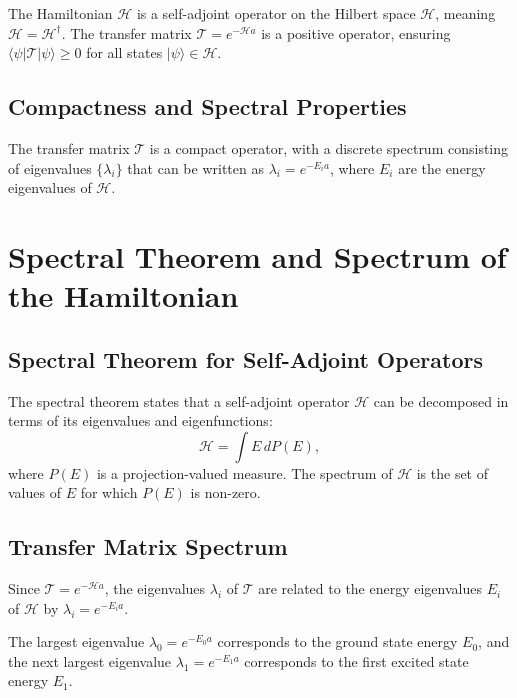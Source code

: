 The Hamiltonian \(\mathcal{H}\) is a self-adjoint operator on the Hilbert space \(\mathcal{H}\), meaning \(\mathcal{H} = \mathcal{H}^\dagger\). The transfer matrix \(\mathcal{T} = e^{-\mathcal{H}a}\) is a positive operator, ensuring \(\langle \psi | \mathcal{T} | \psi \rangle \geq 0\) for all states \(|\psi\rangle \in \mathcal{H}\).

\subsection{Compactness and Spectral Properties}

The transfer matrix \(\mathcal{T}\) is a compact operator, with a discrete spectrum consisting of eigenvalues \(\{\lambda_i\}\) that can be written as \(\lambda_i = e^{-E_i a}\), where \(E_i\) are the energy eigenvalues of \(\mathcal{H}\).



\section{Spectral Theorem and Spectrum of the Hamiltonian}

\subsection{Spectral Theorem for Self-Adjoint Operators}

The spectral theorem states that a self-adjoint operator \(\mathcal{H}\) can be decomposed in terms of its eigenvalues and eigenfunctions:
\begin{equation}
\mathcal{H} = \int E \, dP(E),
\end{equation}
where \(P(E)\) is a projection-valued measure. The spectrum of \(\mathcal{H}\) is the set of values of \(E\) for which \(P(E)\) is non-zero.

\subsection{Transfer Matrix Spectrum}

Since \(\mathcal{T} = e^{-\mathcal{H}a}\), the eigenvalues \(\lambda_i\) of \(\mathcal{T}\) are related to the energy eigenvalues \(E_i\) of \(\mathcal{H}\) by \(\lambda_i = e^{-E_i a}\).

The largest eigenvalue \(\lambda_0 = e^{-E_0 a}\) corresponds to the ground state energy \(E_0\), and the next largest eigenvalue \(\lambda_1 = e^{-E_1 a}\) corresponds to the first excited state energy \(E_1\).



